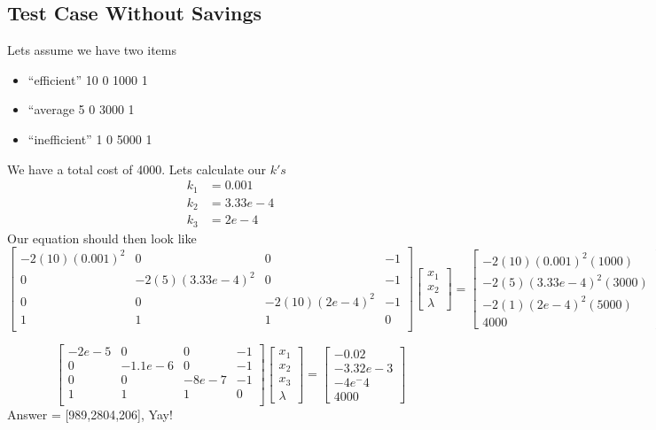 \documentclass[11pt]{article}
\begin{document}
\subsection*{Test Case Without Savings}
Lets assume we have two items
\begin{itemize}
\item ``efficient'' 10 0 1000 1
\item ``average 5 0 3000 1
\item ``inefficient'' 1 0 5000 1
\end{itemize}
We have a total cost of 4000.
Lets calculate our $k's$
\begin{align*}
  k_1 &= 0.001 \\
  k_2 &= 3.33e-4 \\
  k_3 &= 2e-4
\end{align*}
Our equation should then look like
\begin{equation}
\begin{bmatrix}
  -2(10)(0.001)^2 & 0 & 0 & -1\\
  0 & -2(5)(3.33e-4)^2 & 0 & -1\\
  0 & 0 & -2(10)(2e-4)^2 & -1\\
  1 & 1 & 1 & 0\\
\end{bmatrix}
\begin{bmatrix}
  x_1 \\ x_2 \\ \lambda
\end{bmatrix}
=
\begin{bmatrix}
  -2(10)(0.001)^2(1000) \\ -2(5)(3.33e-4)^2(3000) \\ -2(1)(2e-4)^2(5000) \\4000
\end{bmatrix}
\end{equation}

\begin{equation}
\begin{bmatrix}
  -2e-5 & 0 & 0 & -1\\
  0 & -1.1e-6 & 0 & -1\\
  0 & 0 & -8e-7 & -1\\
  1 & 1 & 1 & 0\\
\end{bmatrix}
\begin{bmatrix}
  x_1 \\ x_2 \\ x_3 \\ \lambda
\end{bmatrix}
=
\begin{bmatrix}
  -0.02 \\ -3.32e-3 \\ -4e^-4 \\ 4000
\end{bmatrix}
\end{equation}
Answer = [989,2804,206], Yay!
\end{document}

